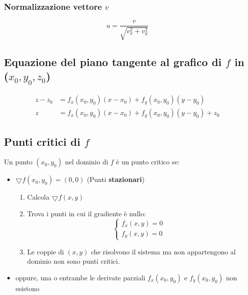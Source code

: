 \documentclass[10pt, a4paper]{article}
\begin{document}
    \subsubsection{Normalizzazione vettore $v$}
        \begin{equation*}
            u=\frac{v}{\sqrt{v_x^2+v_y^2}}
        \end{equation*}
    \subsection{Equazione del piano tangente al grafico di $f$ in ($x_0,y_0,z_0$)}
        \begin{equation*}
            \begin{split}
                z-z_0&=f_x(x_0,y_0)(x-x_0)+f_y(x_0,y_0)(y-y_0)\\
                z&=f_x(x_0,y_0)(x-x_0)+f_y(x_0,y_0)(y-y_0)+z_0
            \end{split}
        \end{equation*}
    \subsection{Punti critici di $f$}
        Un punto $(x_0,y_0)$ nel dominio di $f$ è un punto critico se:
        \begin{itemize}
            \item $\bigtriangledown f(x_0,y_0)=(0,0)$ (Punti \textbf{stazionari}) \begin{enumerate}
                \item Calcola $\bigtriangledown f(x,y)$
                \item Trova i punti in cui il gradiente è nullo: \begin{equation*}
                    \begin{cases}
                        f_x(x,y)=0\\
                        f_y(x,y)=0
                    \end{cases}
                \end{equation*}
                \item Le coppie di $(x,y)$ che risolvono il sistema ma non appartengono al dominio non sono punti critici.
            \end{enumerate}
            \item oppure, una o entrambe le derivate parziali $f_x(x_0,y_0)$ e $f_y(x_0,y_0)$ non esistono
        \end{itemize}
\end{document}
